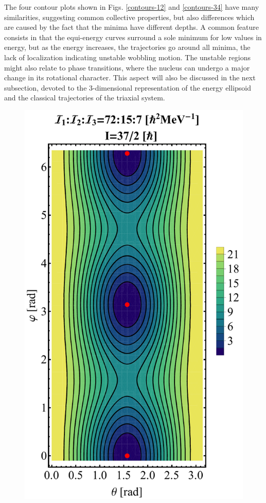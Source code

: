 \documentclass[myclassdoc,debug]{rjparticle}
\begin{document}
The four contour plots shown in Figs. \ref{contours-12} and \ref{contours-34} have many similarities, suggesting common collective properties, but also differences which are caused by the fact that the minima have different depths. A common feature consists in that the equi-energy curves surround a sole minimum for low values in energy, but as the energy increases, the trajectories go around all minima, the lack of localization indicating unstable wobbling motion. The unstable regions might also relate to phase transitions, where the nucleus can undergo a major change in its rotational character. This aspect will also be discussed in the next subsection, devoted to the 3-dimensional representation of the energy ellipsoid and the classical trajectories of the triaxial system.

\begin{figure}
\centering
\begin{minipage}{.5\textwidth}
  \centering
  \includegraphics[scale=0.3]{figs/contour-tsd3.pdf}

\end{minipage}
\end{figure}
\end{document}
